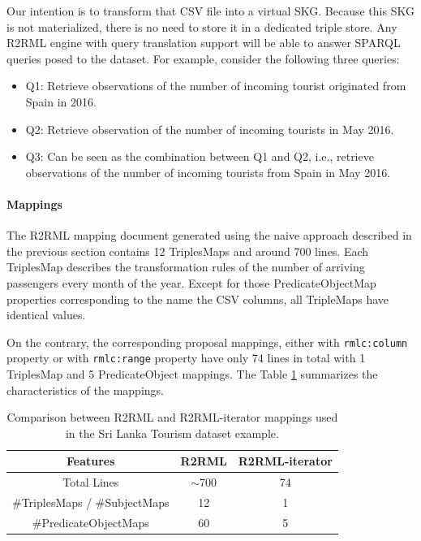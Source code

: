 Our intention is to transform that CSV file into a virtual SKG. Because this SKG is not materialized, there is no need to store it in a dedicated triple store. Any R2RML engine with query translation support will be able to answer SPARQL queries posed to the dataset. For example, consider the following three queries:
\begin{itemize}
\item Q1: Retrieve observations of the number of incoming tourist originated from Spain in 2016.
\item Q2: Retrieve observation of the number of incoming tourists in May 2016.
\item Q3: Can be seen as the combination between Q1 and Q2, i.e., retrieve observations of the number of incoming tourists from Spain in May 2016. 
\end{itemize}

\noindent\paragraph{Mappings}
The R2RML mapping document generated using the naive approach described in the previous section contains 12 TriplesMaps and around 700 lines. Each TriplesMap describes the transformation rules of the number of arriving passengers every month of the year. Except for those PredicateObjectMap properties corresponding to the name the CSV columns, all TripleMaps have identical values. 

On the contrary, the corresponding proposal mappings, either with \texttt{rmlc:column} property or with \texttt{rmlc:range} property have only 74 lines in total with 1 TriplesMap and 5 PredicateObject mappings. The Table \ref{table:compare1} summarizes the characteristics of the mappings.

\begin{table}[tbp]
\caption[R2RML vs R2RML-iterator in Sri Lanka dataset]{Comparison between R2RML and R2RML-iterator mappings used in the Sri Lanka Tourism dataset example.}
\label{table:compare1}
\begin{tabular}{c|c|c}
\hline
\textbf{Features} & \textbf{R2RML}   & \textbf{R2RML-iterator}  \\ \hline
Total Lines   & $\sim$700 & 74 \\ 
\#TriplesMaps / \#SubjectMaps     & 12                & 1           \\
\#PredicateObjectMaps  & 60              & 5            \\ \hline
\end{tabular}
\end{table}

